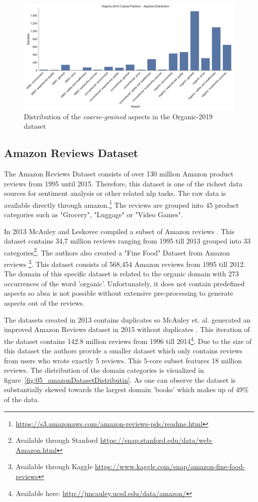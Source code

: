 \begin{figure}[ht]
	\centering
	\includegraphics[width=\textwidth]{figures/05_setup/05_organicCoarseGrained}
	\caption{Distribution of the \textit{coarse-grained} aspects in the Organic-2019 dataset}
	\label{fig:05_organic2019_coarse}
\end{figure}

\subsection{Amazon Reviews Dataset}
\label{sec:05_amazonReviews}
The Amazon Reviews Dataset consists of over 130 million Amazon product reviews from 1995 until 2015. Therefore, this dataset is one of the richest data sources for sentiment analysis or other related \gls{nlp} tasks. The raw data is available directly through amazon.\footnote{\url{https://s3.amazonaws.com/amazon-reviews-pds/readme.html}} The reviews are grouped into 45 product categories such as "Grocery", "Luggage" or "Video Games". 
\medskip

In 2013 McAuley and Leskovec compiled a subset of Amazon reviews \cite{McAuley2013}. This dataset contains 34,7 million reviews ranging from 1995 till 2013 grouped into 33 categories\footnote{Available through Stanford \url{https://snap.stanford.edu/data/web-Amazon.html}}. The authors also created a "Fine Food" Dataset from Amazon reviews \cite{McAuley2013a} \footnote{Available through Kaggle \url{https://www.kaggle.com/snap/amazon-fine-food-reviews}}. This dataset consists of 568,454 Amazon reviews from 1995 till 2012. The domain of this specific dataset is related to the organic domain with 273 occurrences of the word 'organic'. Unfortunately, it does not contain predefined aspects so \gls{absa} is not possible without extensive pre-processing to generate aspects out of the reviews.
\medskip

The datasets created in 2013 contains duplicates so McAuley et. al. generated an improved Amazon Reviews dataset in 2015 without duplicates \cite{McAuley2015}\cite{He2016}. This iteration of the dataset contains 142.8 million reviews from 1996 till 2014\footnote{Available here: \url{http://jmcauley.ucsd.edu/data/amazon/}}. Due to the size of this dataset the authors provide a smaller dataset which only contains reviews from users who wrote exactly 5 reviews. This 5-core subset features 18 million reviews. The distribution of the domain categories is visualized in figure~\ref{fig:05_amazonDatasetDistributin}. As one can observe the dataset is substantially skewed towards the largest domain 'books' which makes up of 49\% of the data.
\medskip


